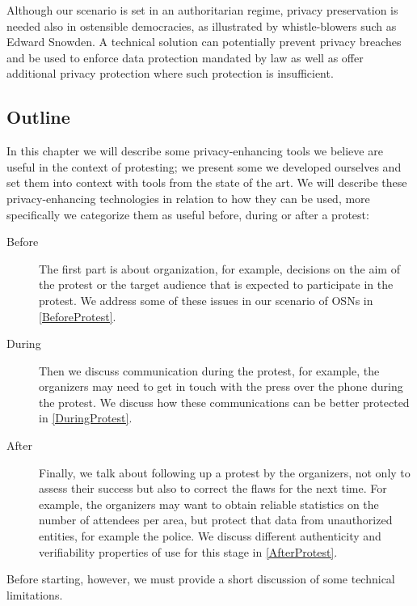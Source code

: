 Although our scenario is set in an authoritarian regime, privacy
preservation is needed also in ostensible democracies, as illustrated
by whistle-blowers such as Edward Snowden. 
A technical solution can potentially prevent privacy breaches and be
used to enforce data protection mandated by law as well as offer
additional privacy protection where such protection is insufficient.



\subsection{Outline}
\label{Outline}

In this chapter we will describe some privacy-enhancing tools we
believe are useful in the context of protesting; we present some we
developed ourselves and set them into context with tools from the
state of the art.  We will describe these privacy-enhancing
technologies in relation to how they can be used, more specifically we
categorize them as useful before, during or after a protest:
\begin{description}
  \item[Before]
    The first part is about organization, for example, decisions on the aim of the protest or the 
    target audience that is expected to participate in the protest.
    We address some of these issues in our scenario of \acp{OSN} in 
    \cref{BeforeProtest}.

  \item[During]
    Then we discuss communication during the protest, for example, the organizers may need to 
    get in touch with the press over the phone during the protest.
    We discuss how these communications can be better protected in 
    \cref{DuringProtest}.

  \item[After]
    Finally, we talk about following up a protest by the organizers, not only to assess their success 
    but also to correct the flaws for the next time.  For example, the 
    organizers may want to obtain reliable statistics on the number of 
    attendees per area, but protect that data from unauthorized
    entities, for example the police.
    We discuss different authenticity and verifiability properties of use for 
    this stage in \cref{AfterProtest}.
\end{description}

Before starting, however, we must provide a short discussion of some technical 
limitations.

